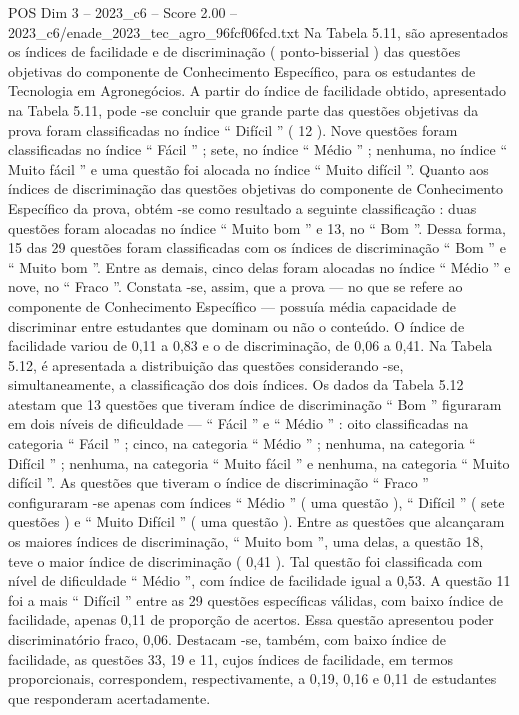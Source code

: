 \begin{textsample}{POS Dim 3 – 2023\_c6 – Score 2.00 – 2023\_c6/enade\_2023\_tec\_agro\_96fcf06fcd.txt}
Na Tabela 5.11, são apresentados os índices de facilidade e de discriminação ( ponto-bisserial ) das questões objetivas do componente de Conhecimento Específico, para os estudantes de Tecnologia em Agronegócios.
A partir do índice de facilidade obtido, apresentado na Tabela 5.11, pode -se concluir que grande parte das questões objetivas da prova foram classificadas no índice “ Difícil ” ( 12 ).
Nove questões foram classificadas no índice “ Fácil ” ; sete, no índice “ Médio ” ; nenhuma, no índice “ Muito fácil ” e uma questão foi alocada no índice “ Muito difícil ”.
Quanto aos índices de discriminação das questões objetivas do componente de Conhecimento Específico da prova, obtém -se como resultado a seguinte classificação : duas questões foram alocadas no índice “ Muito bom ” e 13, no “ Bom ”.
Dessa forma, 15 das 29 questões foram classificadas com os índices de discriminação “ Bom ” e “ Muito bom ”.
Entre as demais, cinco delas foram alocadas no índice “ Médio ” e nove, no “ Fraco ”.
Constata -se, assim, que a prova — no que se refere ao componente de Conhecimento Específico — possuía média capacidade de discriminar entre estudantes que dominam ou não o conteúdo.
O índice de facilidade variou de 0,11 a 0,83 e o de discriminação, de 0,06 a 0,41.
Na Tabela 5.12, é apresentada a distribuição das questões considerando -se, simultaneamente, a classificação dos dois índices.
Os dados da Tabela 5.12 atestam que 13 questões que tiveram índice de discriminação “ Bom ” figuraram em dois níveis de dificuldade — “ Fácil ” e “ Médio ” : oito classificadas na categoria “ Fácil ” ; cinco, na categoria “ Médio ” ; nenhuma, na categoria “ Difícil ” ; nenhuma, na categoria “ Muito fácil ” e nenhuma, na categoria “ Muito difícil ”.
As questões que tiveram o índice de discriminação “ Fraco ” configuraram -se apenas com índices “ Médio ” ( uma questão ), “ Difícil ” ( sete questões ) e “ Muito Difícil ” ( uma questão ).
Entre as questões que alcançaram os maiores índices de discriminação, “ Muito bom ”, uma delas, a questão 18, teve o maior índice de discriminação ( 0,41 ).
Tal questão foi classificada com nível de dificuldade “ Médio ”, com índice de facilidade igual a 0,53.
A questão 11 foi a mais “ Difícil ” entre as 29 questões específicas válidas, com baixo índice de facilidade, apenas 0,11 de proporção de acertos.
Essa questão apresentou poder discriminatório fraco, 0,06.
Destacam -se, também, com baixo índice de facilidade, as questões 33, 19 e 11, cujos índices de facilidade, em termos proporcionais, correspondem, respectivamente, a 0,19, 0,16 e 0,11 de estudantes que responderam acertadamente.

\end{textsample}
